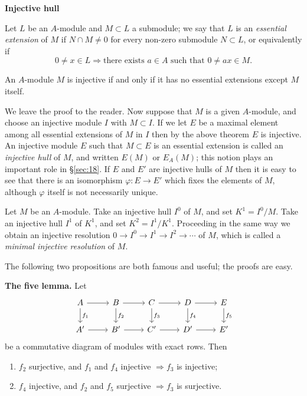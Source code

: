 \medskip
\noindent\textbf{Injective hull}

Let $L$ be an $A$-module and $M \subset L$ a submodule; we say that $L$ is an
\emph{essential extension} of $M$ if $N \cap M \ne 0$ for every non-zero submodule $N \subset L$,
or equivalently if
\[
  0 \ne x \in L \Rightarrow \text{there exists } a \in A \text{ such that } 0 \ne ax \in M.
\]

\begin{theorem}\label{thm:B4}
An $A$-module $M$ is injective if and only if it has no essential extensions
except $M$ itself.
\end{theorem}

We leave the proof to the reader. Now suppose that $M$ is a given $A$-module,
and choose an injective module $I$ with $M \subset I$. If we let $E$ be a maximal
element among all essential extensions of $M$ in $I$ then by the above theorem
$E$ is injective. An injective module $E$ such that $M \subset E$ is an essential
extension is called an \emph{injective hull} of $M$, and written $E(M)$ or $E_A(M)$; this
notion plays an important role in \S\ref{sec:18}. If $E$ and $E'$ are injective hulls of
$M$ then it is easy to see that there is an isomorphism $\varphi\colon E \to E'$ which
fixes the elements of $M$, although $\varphi$ itself is not necessarily unique.

Let $M$ be an $A$-module. Take an injective hull $I^0$ of $M$, and set
$K^1 = I^0/M$. Take an injective hull $I^1$ of $K^1$, and set $K^2 = I^1/K^1$.
Proceeding in the same way we obtain an injective resolution
$0 \to I^0 \to I^1 \to I^2 \to \cdots$ of $M$, which is called a \emph{minimal injective
resolution} of $M$.

The following two propositions are both famous and useful; the proofs are easy.

\medskip
\noindent\textbf{The five lemma.} Let
\[
\begin{tikzcd}
A \arrow[r] \arrow[d, "f_1"] & B \arrow[r] \arrow[d, "f_2"] & C \arrow[r] \arrow[d, "f_3"] & D \arrow[r] \arrow[d, "f_4"] & E \arrow[d, "f_5"] \\
A' \arrow[r] & B' \arrow[r] & C' \arrow[r] & D' \arrow[r] & E'
\end{tikzcd}
\]
be a commutative diagram of modules with exact rows. Then
\begin{enumerate}[(1)]
  \item $f_2$ surjective, and $f_1$ and $f_4$ injective $\Rightarrow f_3$ is injective;
  \item $f_4$ injective, and $f_2$ and $f_5$ surjective $\Rightarrow f_3$ is surjective.
\end{enumerate}


